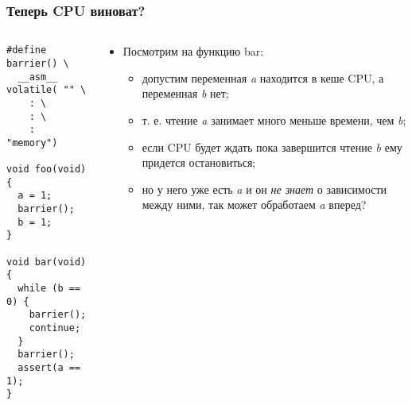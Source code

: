 \begin{frame}[fragile]
\frametitle{Теперь CPU виноват?}
\begin{columns}
  \begin{column}{0.35\linewidth}
    \begin{lstlisting}
#define barrier() \
  __asm__ volatile( "" \
	: \
	: \
	: "memory")

void foo(void)
{
  a = 1;
  barrier();
  b = 1;
}

void bar(void)
{
  while (b == 0) {
    barrier();
    continue;
  }
  barrier();
  assert(a == 1);
}
    \end{lstlisting}
  \end{column}
  \begin{column}{0.6\linewidth}
  \begin{itemize}
    \item Посмотрим на функцию bar:
    \begin{itemize}
      \item допустим переменная \emph{a} находится в кеше CPU, а переменная
      \emph{b} нет;
      \item т. е. чтение \emph{a} занимает много меньше времени, чем \emph{b};
      \item если CPU будет ждать пока завершится чтение \emph{b} ему придется
      остановиться;
      \item но у него уже есть \emph{a} и он \emph{не знает} о зависимости между
      ними, так может обработаем \emph{a} вперед?
    \end{itemize}
  \end{itemize}
  \end{column}
\end{columns}
\end{frame}

